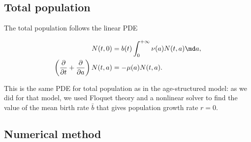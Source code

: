 \documentclass{jpmarticle}
\let\subequationsorig\subequations%
\let\endsubequationsorig\endsubequations%
\renewenvironment{subequations}{
  \subequationsorig
  \renewcommand{\theequation}{\theparentequation.\arabic{equation}}
}{
  \endsubequationsorig
}
\begin{document}
\subsection{Total population}

The total population follows the linear PDE
\begin{subequations}
  \begin{align}
    N(t, 0) &=
    b(t) \int_0^{+\infty} \nu(a) N(t, a) \md a,
    \\
    \left(\frac{\partial}{\partial t}
      + \frac{\partial}{\partial a}\right)
    N(t, a) &=
    - \mu(a) N(t, a).
  \end{align}
\end{subequations}
This is the same PDE for total population as in the age-structured
model: as we did for that model, we used Floquet theory and a
nonlinear solver to find the value of the mean birth rate $\bar{b}$
that gives population growth rate $r = 0$.


\subsection{Numerical method}
\end{document}
